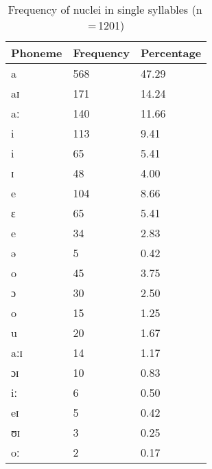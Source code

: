\begin{table}[pth]\centering
\caption[Frequency of nuclei in single syllables]{Frequency of nuclei in single syllables (n\,=\,1201)}
\begin{tabu} to 0.5\textwidth{X X[c] X[c]}
\tableheaderfont\toprule
Phoneme
	& Frequency
	& Percentage
	\\
	
\toprule

a
	& 568
	& 47.29\pct
	\\

aɪ
	& 171
	& 14.24\pct
	\\

aː
	& 140
	& 11.66\pct
	\\

\midrule

i
	& 113
	& 9.41\pct
	\\

\rowfont{\scriptsize\itshape}
\raggedleft
i
	& 65
	& 5.41\pct
	\\

\rowfont{\scriptsize\itshape}
\raggedleft
ɪ
	& 48
	& 4.00\pct
	\\

\midrule

e
	& 104
	& 8.66\pct
	\\

\rowfont{\scriptsize\itshape}
\raggedleft
ɛ
	& 65
	& 5.41\pct
	\\

\rowfont{\scriptsize\itshape}
\raggedleft
e
	& 34
	& 2.83\pct
	\\

\rowfont{\scriptsize\itshape}
\raggedleft
ə
	& 5
	& 0.42\pct
	\\

\midrule

o
	& 45
	& 3.75\pct
	\\

\rowfont{\scriptsize\itshape}
\raggedleft
ɔ
	& 30
	& 2.50\pct
	\\

\rowfont{\scriptsize\itshape}
\raggedleft
o
	& 15
	& 1.25\pct
	\\

\midrule

u
	& 20
	& 1.67\pct
	\\

aːɪ
	& 14
	& 1.17\pct
	\\

ɔɪ
	& 10
	& 0.83\pct
	\\

iː
	& 6
	& 0.50\pct
	\\

eɪ
	& 5
	& 0.42\pct
	\\

ʊɪ
	& 3
	& 0.25\pct
	\\

oː
	& 2
	& 0.17\pct
	\\

\bottomrule
\end{tabu}
\label{tab:singnuc}
\end{table}

